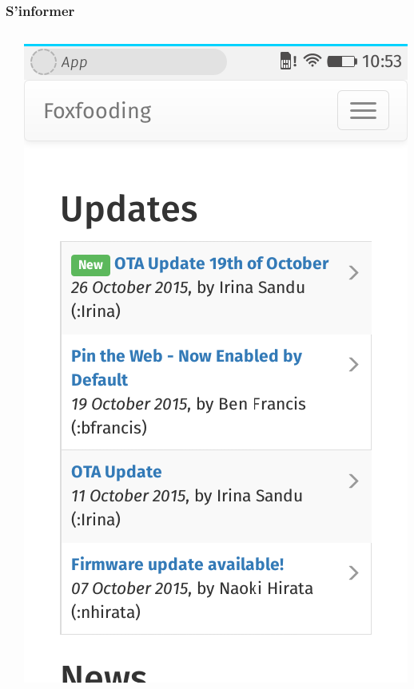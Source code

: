 \documentclass{beamer}
\begin{document}
\begin{frame}
\frametitle{S'informer}
\begin{columns}[T]
\begin{column}{5cm}
\begin{block}{}
\justifying{

}
\end{block} 
\end{column}
\begin{column}{5cm}
\includegraphics[scale=0.25] {./images/FFOS_FoxFooding.png} 
\end{column}
\end{columns}  
\end{frame}
\end{document}
